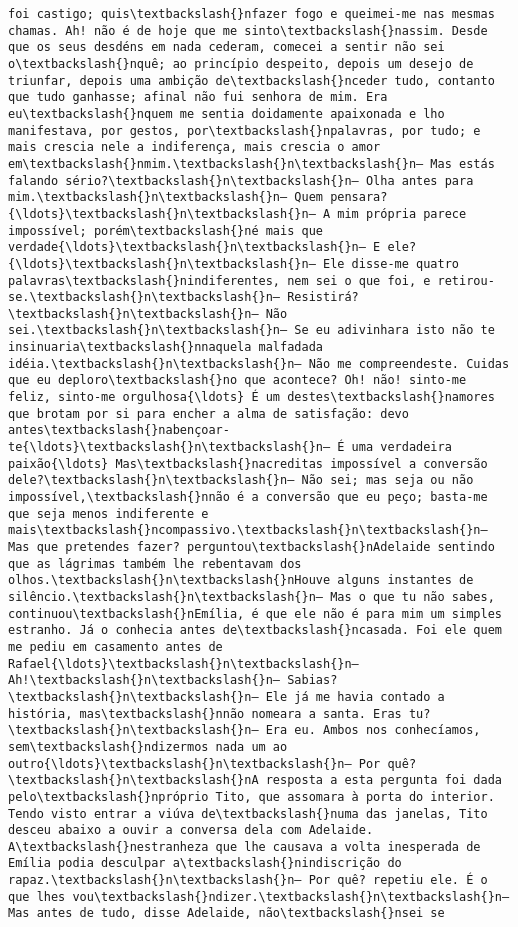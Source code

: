 \documentclass[11pt]{article}
\begin{document}
\begin{Verbatim}[commandchars=\\\{\}]
foi castigo; quis\textbackslash{}nfazer fogo e queimei-me nas mesmas chamas. Ah! não é de hoje que me sinto\textbackslash{}nassim. Desde que os seus desdéns em nada cederam, comecei a sentir não sei o\textbackslash{}nquê; ao princípio despeito, depois um desejo de triunfar, depois uma ambição de\textbackslash{}nceder tudo, contanto que tudo ganhasse; afinal não fui senhora de mim. Era eu\textbackslash{}nquem me sentia doidamente apaixonada e lho manifestava, por gestos, por\textbackslash{}npalavras, por tudo; e mais crescia nele a indiferença, mais crescia o amor em\textbackslash{}nmim.\textbackslash{}n\textbackslash{}n— Mas estás falando sério?\textbackslash{}n\textbackslash{}n— Olha antes para mim.\textbackslash{}n\textbackslash{}n— Quem pensara?{\ldots}\textbackslash{}n\textbackslash{}n— A mim própria parece impossível; porém\textbackslash{}né mais que verdade{\ldots}\textbackslash{}n\textbackslash{}n— E ele?{\ldots}\textbackslash{}n\textbackslash{}n— Ele disse-me quatro palavras\textbackslash{}nindiferentes, nem sei o que foi, e retirou-se.\textbackslash{}n\textbackslash{}n— Resistirá?\textbackslash{}n\textbackslash{}n— Não sei.\textbackslash{}n\textbackslash{}n— Se eu adivinhara isto não te insinuaria\textbackslash{}nnaquela malfadada idéia.\textbackslash{}n\textbackslash{}n— Não me compreendeste. Cuidas que eu deploro\textbackslash{}no que acontece? Oh! não! sinto-me feliz, sinto-me orgulhosa{\ldots} É um destes\textbackslash{}namores que brotam por si para encher a alma de satisfação: devo antes\textbackslash{}nabençoar-te{\ldots}\textbackslash{}n\textbackslash{}n— É uma verdadeira paixão{\ldots} Mas\textbackslash{}nacreditas impossível a conversão dele?\textbackslash{}n\textbackslash{}n— Não sei; mas seja ou não impossível,\textbackslash{}nnão é a conversão que eu peço; basta-me que seja menos indiferente e mais\textbackslash{}ncompassivo.\textbackslash{}n\textbackslash{}n— Mas que pretendes fazer? perguntou\textbackslash{}nAdelaide sentindo que as lágrimas também lhe rebentavam dos olhos.\textbackslash{}n\textbackslash{}nHouve alguns instantes de silêncio.\textbackslash{}n\textbackslash{}n— Mas o que tu não sabes, continuou\textbackslash{}nEmília, é que ele não é para mim um simples estranho. Já o conhecia antes de\textbackslash{}ncasada. Foi ele quem me pediu em casamento antes de Rafael{\ldots}\textbackslash{}n\textbackslash{}n— Ah!\textbackslash{}n\textbackslash{}n— Sabias?\textbackslash{}n\textbackslash{}n— Ele já me havia contado a história, mas\textbackslash{}nnão nomeara a santa. Eras tu?\textbackslash{}n\textbackslash{}n— Era eu. Ambos nos conhecíamos, sem\textbackslash{}ndizermos nada um ao outro{\ldots}\textbackslash{}n\textbackslash{}n— Por quê?\textbackslash{}n\textbackslash{}nA resposta a esta pergunta foi dada pelo\textbackslash{}npróprio Tito, que assomara à porta do interior. Tendo visto entrar a viúva de\textbackslash{}numa das janelas, Tito desceu abaixo a ouvir a conversa dela com Adelaide. A\textbackslash{}nestranheza que lhe causava a volta inesperada de Emília podia desculpar a\textbackslash{}nindiscrição do rapaz.\textbackslash{}n\textbackslash{}n— Por quê? repetiu ele. É o que lhes vou\textbackslash{}ndizer.\textbackslash{}n\textbackslash{}n— Mas antes de tudo, disse Adelaide, não\textbackslash{}nsei se 
\end{Verbatim}
\end{document}
